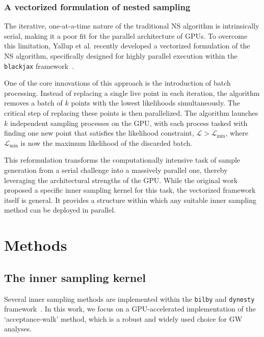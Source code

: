 \documentclass[fleqn,usenatbib]{mnras}
\begin{document}
\subsubsection{A vectorized formulation of nested sampling}
\label{sec:background_vectorized_ns}

The iterative, one-at-a-time nature of the traditional NS algorithm
is intrinsically serial, making it a poor fit for the parallel
architecture of GPUs. To overcome this limitation, Yallup et al.
recently developed a vectorized formulation of the NS algorithm,
specifically designed for highly parallel execution within the
\texttt{blackjax} framework~\citep{yallup2025nested, cabezas2024blackjax}.

One of the core innovations of this approach is the introduction of batch
processing. Instead of replacing a single live point in each iteration,
the algorithm removes a batch of $k$ points with the lowest likelihoods
simultaneously. The critical step of replacing these points is then
parallelized. The algorithm launches $k$ independent sampling processes
on the GPU, with each process tasked with finding one new point that
satisfies the likelihood constraint, $\mathcal{L} > \mathcal{L}_{\text{min}}$,
where $\mathcal{L}_{\text{min}}$ is now the maximum likelihood of the
discarded batch.

This reformulation transforms the computationally intensive task of
sample generation from a serial challenge into a massively parallel one,
thereby leveraging the architectural strengths of the GPU. While the
original work proposed a specific inner sampling kernel for this task,
the vectorized framework itself is general. It provides a structure
within which any suitable inner sampling method can be deployed in
parallel.


\section{Methods}

\subsection{The inner sampling kernel}
\label{sec:methods_kernel}

Several inner sampling methods are implemented within the
\texttt{bilby} and \texttt{dynesty} framework~\citep{bilby_paper, dynesty}. In this work, we
focus on a GPU-accelerated implementation of the `acceptance-walk'
method, which is a robust and widely used choice for GW analyses.
\end{document}
